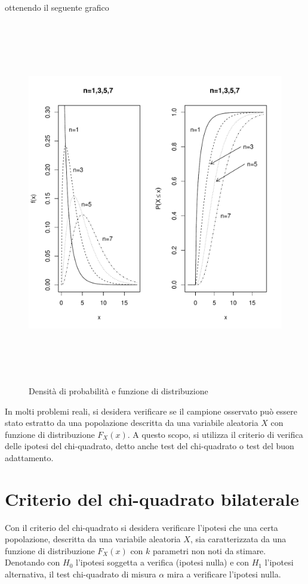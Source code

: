 ottenendo il seguente grafico

\begin{figure}[!htb]
    \centering
    \includegraphics[height=16cm]{capitoli/images/4_chiquadrato/densProbChi.pdf}
    \caption{Densità di probabilità e funzione di distribuzione}
\end{figure}

In molti problemi reali, si desidera verificare se il campione osservato può essere stato estratto da una popolazione descritta da una variabile aleatoria $X$ con funzione di distribuzione $F_X(x)$. A questo scopo, si utilizza il criterio di verifica delle ipotesi del chi-quadrato, detto anche test del chi-quadrato o test del buon adattamento.

\section{Criterio del chi-quadrato bilaterale}

Con il criterio del  chi-quadrato si desidera verificare l'ipotesi che una certa popolazione, descritta da una variabile aleatoria $X$, sia caratterizzata da una funzione di distribuzione $F_X(x)$ con $k$ parametri non noti da stimare. Denotando con $H_0$ l'ipotesi soggetta a verifica (ipotesi nulla) e con $H_1$ l'ipotesi alternativa, il test chi-quadrato di misura $\alpha$ mira a verificare l'ipotesi nulla.

